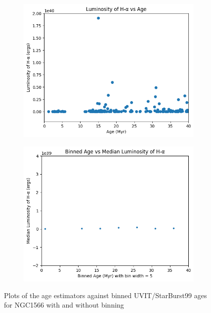 \documentclass[12pt]{report}
\begin{document}
\begin{figure}[htbp]
    \begin{subfigure}{0.45\textwidth}
        \centering
        \includegraphics[width=\linewidth]{image26.png}
        \label{fig:image26}
    \end{subfigure}
    \hfill
    \begin{subfigure}{0.45\textwidth}
        \centering
        \includegraphics[width=\linewidth]{image27.png}
        \label{fig:image27}
    \end{subfigure}

    \small
    \caption{Plots of the age estimators against binned UVIT/StarBurst99 ages for NGC1566 with and without binning}
    \label{fig:UVIT_ages}

\end{figure}
\end{document}
